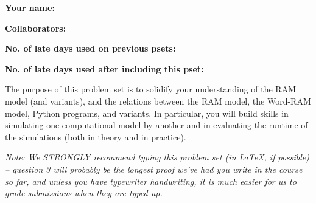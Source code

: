 \documentclass[11pt]{article}
\begin{document}

\textbf{Your name: }

\textbf{Collaborators: }

\textbf{No. of late days used on previous psets: }

\textbf{No. of late days used after including this pset: }


The purpose of this problem set is to solidify your understanding of the RAM model (and variants), and the relations between the RAM model, the Word-RAM model, Python programs, and variants. In particular, you will build skills in simulating one computational model by another and in evaluating the runtime of the simulations (both in theory and in practice).

\textit{Note: We STRONGLY recommend typing this problem set (in LaTeX, if possible) -- question 3 will probably be the longest proof we've had you write in the course so far, and unless you have typewriter handwriting, it is much easier for us to grade submissions when they are typed up.}
\end{document}
